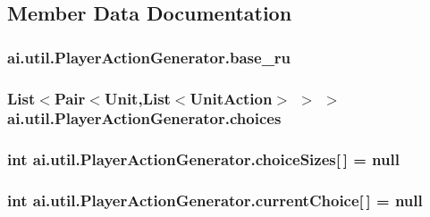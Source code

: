 \subsection{Member Data Documentation}
\hypertarget{classai_1_1util_1_1_player_action_generator_a42eb1a174f5a0348eaf3e7c69a17a32c}{
\subsubsection[{base\_\-ru}]{ {\bf ai.util.PlayerActionGenerator.base\_\-ru}}}
\label{classai_1_1util_1_1_player_action_generator_a42eb1a174f5a0348eaf3e7c69a17a32c}
\hypertarget{classai_1_1util_1_1_player_action_generator_aeea7fa8dec447b99c43c404ae8dbc9c6}{
\subsubsection[{choices}]{\setlength{\rightskip}{0pt plus 5cm}List$<$Pair$<${\bf Unit},List$<${\bf UnitAction}$>$ $>$ $>$ {\bf ai.util.PlayerActionGenerator.choices}}}
\label{classai_1_1util_1_1_player_action_generator_aeea7fa8dec447b99c43c404ae8dbc9c6}
\hypertarget{classai_1_1util_1_1_player_action_generator_a5bb3a20eebe61f34068dcf7e80ec81cc}{
\subsubsection[{choiceSizes}]{\setlength{\rightskip}{0pt plus 5cm}int {\bf ai.util.PlayerActionGenerator.choiceSizes}\mbox{[}$\,$\mbox{]} = null}}
\label{classai_1_1util_1_1_player_action_generator_a5bb3a20eebe61f34068dcf7e80ec81cc}
\hypertarget{classai_1_1util_1_1_player_action_generator_a6942eafe123c2bea65a5e8e96c7337d5}{
\subsubsection[{currentChoice}]{\setlength{\rightskip}{0pt plus 5cm}int {\bf ai.util.PlayerActionGenerator.currentChoice}\mbox{[}$\,$\mbox{]} = null}}
